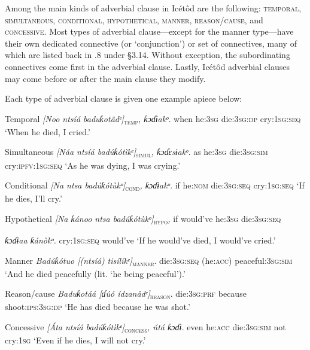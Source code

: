 \begin{table}
Among the main kinds of adverbial clause in Icétôd are the following: \textsc{temporal}, \textsc{simultaneous}, \textsc{conditional}, \textsc{hypothetical}, \textsc{manner}, \textsc{reason}/\textsc{cause}, and \textsc{concessive}. Most types of adverbial clause—except for the manner type—have their own dedicated connective (or ‘conjunction’) or set of connectives, many of which are listed back in .8 under §3.14. Without exception, the subordinating connectives come first in the adverbial clause. Lastly, Icétôd adverbial clauses may come before or after the main clause they modify. 

Each type of adverbial clause is given one example apiece below:




Temporal
\textit{[Noo   ntsíá     baduƙotâdᵉ]}\textsc{\textsubscript{temp}}\textit{,   ƙɔɗɨakᵒ.}
when   he:\textsc{3sg}   die:\textsc{3sg:dp}     cry:\textsc{1sg:seq}
‘When he died, I cried.’




Simultaneous
\textit{[Náa   ntsíá     badúƙótìkᵉ]}\textsc{\textsubscript{simul}}\textit{,   ƙɔɗɛsɨakᵒ.}
as   he:\textsc{3sg}   die:\textsc{3sg:sim}    cry:\textsc{ipfv}:\textsc{1sg:seq}
‘As he was dying, I was crying.’




Conditional
\textit{[Na   ntsa     badúƙótùkᵒ]}\textsc{\textsubscript{cond}}\textit{,   ƙɔɗɨakᵒ.}
if   he:\textsc{nom}   die:\textsc{3sg:seq}     cry:\textsc{1sg:seq}
‘If he dies, I’ll cry.’




Hypothetical
\textit{[Na   ƙánoo   ntsa    badúƙótùkᵒ]}\textsc{\textsubscript{hypo}}\textit{, }
if   would’ve   he:\textsc{3sg}  die:\textsc{3sg:seq}   

\textit{ƙɔɗɨaa   ƙánòkᵒ.}
cry:\textsc{1sg:seq  }would’ve
‘If he would’ve died, I would’ve cried.’




Manner
\textit{Badúƙótuo   [(ntsíá)   tisílíkᵉ]}\textsc{\textsubscript{manner}}.
die:\textsc{3sg:seq}   (he:\textsc{acc})  peaceful:3\textsc{sg:sim}
‘And he died peacefully (lit. ‘he being peaceful’).’




Reason/cause
\textit{Baduƙotáá   [ɗúó     ídzanâdᵉ]}\textsc{\textsubscript{reason}}.
die:\textsc{3sg:prf}   because   shoot:\textsc{ips:3sg:dp}
‘He has died because he was shot.’




Concessive
\textit{[Áta   ntsíá     badúƙótìkᵉ]}\textsc{\textsubscript{concess}}\textit{,   ńtá   ƙɔɗɨ.}
even   he:\textsc{acc}   die:\textsc{3sg:sim}    not   cry:\textsc{1sg}
‘Even if he dies, I will not cry.’







\end{table}
